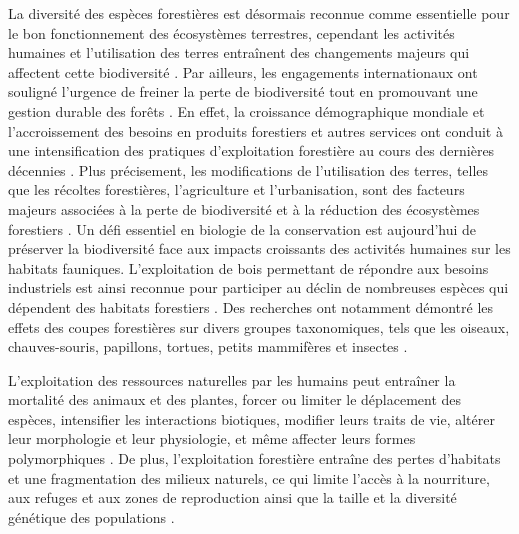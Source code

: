 La diversité des espèces forestières est désormais reconnue comme essentielle pour le bon fonctionnement des écosystèmes terrestres, cependant les activités humaines et l'utilisation des terres entraînent des changements majeurs qui affectent cette biodiversité \citep{Newbold2015Globaleffects}.
Par ailleurs, les engagements internationaux ont souligné l'urgence de freiner la perte de biodiversité tout en promouvant une gestion durable des forêts \citep{Scherer-Lorenzen2005ForestDiversity,Parviainen2007Maintenanceconservation}. 
En effet, la croissance démographique mondiale et l'accroissement des besoins en produits forestiers et autres services ont conduit à une intensification des pratiques d'exploitation forestière au cours des dernières décennies \citep{Foley2005GlobalConsequences}. 
Plus précisement, les modifications de l'utilisation des terres, telles que les récoltes forestières, l'agriculture et l'urbanisation, sont des facteurs majeurs associées à la perte de biodiversité et à la réduction des écosystèmes forestiers \citep{Sala2000Globalbiodiversity,Naeem2012functionsbiological,Bichet2016Maintaininganimal}.
Un défi essentiel en biologie de la conservation est aujourd'hui de préserver la biodiversité face aux impacts croissants des activités humaines sur les habitats fauniques. 
L'exploitation de bois permettant de répondre aux besoins industriels est ainsi reconnue pour participer au déclin de nombreuses espèces qui dépendent des habitats forestiers \citep{Bengtsson2000Biodiversitydisturbances}. 
Des recherches ont notamment démontré les effets des coupes forestières sur divers groupes taxonomiques, tels que les oiseaux, chauves-souris, papillons, tortues, petits mammifères et insectes \citep{Summerville2011Managingforest,Currylow2012ShortTermForest,Kaminski2013EffectsForest,Kellner2013Shorttermresponses,Caldwell2019ComparisonBat}.


L'exploitation des ressources naturelles par les humains peut entraîner la mortalité des animaux et des plantes, forcer ou limiter le déplacement des espèces, intensifier les interactions biotiques, modifier leurs traits de vie, altérer leur morphologie et leur physiologie, et même affecter leurs formes polymorphiques \citep{Sergio2018Animalresponses}. 
De plus, l'exploitation forestière entraîne des pertes d'habitats et une fragmentation des milieux naturels, ce qui limite l'accès à la nourriture, aux refuges et aux zones de reproduction ainsi que la taille et la diversité génétique des populations \citep{Coelho2020Effectsanthropogenic}.

